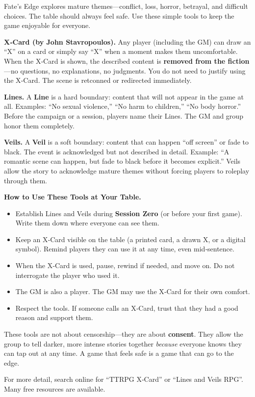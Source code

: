 \begin{tcolorbox}[colback=red!5!white, colframe=red!75!black, title=\textbf{Safety Tools: Lines, Veils \& X‑Card}, fonttitle=\bfseries\large]
Fate's Edge explores mature themes—conflict, loss, horror, betrayal, and difficult choices. The table should always feel safe. Use these simple tools to keep the game enjoyable for everyone.

\medskip
\noindent\textbf{X‑Card (by John Stavropoulos).} Any player (including the GM) can draw an “X” on a card or simply say “X” when a moment makes them uncomfortable. When the X‑Card is shown, the described content is \textbf{removed from the fiction}—no questions, no explanations, no judgments. You do not need to justify using the X‑Card. The scene is retconned or redirected immediately.

\medskip
\noindent\textbf{Lines.} A \textbf{Line} is a hard boundary: content that will not appear in the game at all. Examples: “No sexual violence,” “No harm to children,” “No body horror.” Before the campaign or a session, players name their Lines. The GM and group honor them completely.

\medskip
\noindent\textbf{Veils.} A \textbf{Veil} is a soft boundary: content that can happen “off screen” or fade to black. The event is acknowledged but not described in detail. Example: “A romantic scene can happen, but fade to black before it becomes explicit.” Veils allow the story to acknowledge mature themes without forcing players to roleplay through them.

\medskip
\noindent\textbf{How to Use These Tools at Your Table.}
\begin{itemize}
\item Establish Lines and Veils during \textbf{Session Zero} (or before your first game). Write them down where everyone can see them.
\item Keep an X‑Card visible on the table (a printed card, a drawn X, or a digital symbol). Remind players they can use it at any time, even mid‑sentence.
\item When the X‑Card is used, pause, rewind if needed, and move on. Do not interrogate the player who used it.
\item The GM is also a player. The GM may use the X‑Card for their own comfort.
\item Respect the tools. If someone calls an X‑Card, trust that they had a good reason and support them.
\end{itemize}

\medskip
\noindent These tools are not about censorship—they are about \textbf{consent}. They allow the group to tell darker, more intense stories together \emph{because} everyone knows they can tap out at any time. A game that feels safe is a game that can go to the edge.

\medskip
\noindent For more detail, search online for “TTRPG X‑Card” or “Lines and Veils RPG”. Many free resources are available.
\end{tcolorbox}

